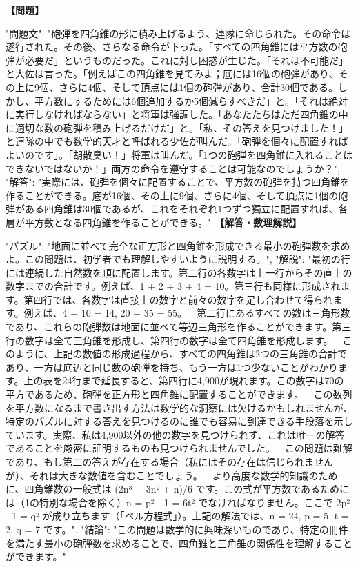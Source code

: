 \documentclass[10pt,a4paper,oneside,openany]{ltjsbook}
\begin{document}
\begin{tcolorbox}[colback=softblue,colframe=primaryblue,title=\textbf{第 138 問：THE ARTILLERYMEN'S DILEMMA.},arc=2mm,boxrule=1pt,breakable]
\textbf{【問題】}\par\vspace{0.3em}
{
  "問題文": "砲弾を四角錐の形に積み上げるよう、連隊に命じられた。その命令は遂行された。その後、さらなる命令が下った。「すべての四角錐には平方数の砲弾が必要だ」というものだった。これに対し困惑が生じた。「それは不可能だ」と大佐は言った。「例えばこの四角錐を見てみよ；底には16個の砲弾があり、その上に9個、さらに4個、そして頂点には1個の砲弾があり、合計30個である。しかし、平方数にするためには6個追加するか5個減らすべきだ」と。「それは絶対に実行しなければならない」と将軍は強調した。「あなたたちはただ四角錐の中に適切な数の砲弾を積み上げるだけだ」と。「私、その答えを見つけました！」と連隊の中でも数学的天才と呼ばれる少佐が叫んだ。「砲弾を個々に配置すればよいのです」。「胡散臭い！」将軍は叫んだ。「1つの砲弾を四角錐に入れることはできないではないか！」両方の命令を遵守することは可能なのでしょうか？",
  "解答": "実際には、砲弾を個々に配置することで、平方数の砲弾を持つ四角錐を作ることができる。底が16個、その上に9個、さらに4個、そして頂点に1個の砲弾がある四角錐は30個であるが、これをそれぞれ1つずつ獨立に配置すれば、各層が平方数となる四角錐を作ることができる。"
}
\tcblower
\textbf{【解答・数理解説】}\par\vspace{0.3em}
{
    "パズル": "地面に並べて完全な正方形と四角錐を形成できる最小の砲弾数を求めよ。この問題は、初学者でも理解しやすいように説明する。",
    "解説": "最初の行には連続した自然数を順に配置します。第二行の各数字は上一行からその直上の数字までの合計です。例えば、1 + 2 + 3 + 4 = 10。第三行も同様に形成されます。第四行では、各数字は直接上の数字と前々の数字を足し合わせて得られます。例えば、4 + 10 = 14, 20 + 35 = 55。\
\
第二行にあるすべての数は三角形数であり、これらの砲弾数は地面に並べて等辺三角形を作ることができます。第三行の数字は全て三角錐を形成し、第四行の数字は全て四角錐を形成します。\
\
このように、上記の数値の形成過程から、すべての四角錐は2つの三角錐の合計であり、一方は底辺と同じ数の砲弾を持ち、もう一方は1つ少ないことがわかります。上の表を24行まで延長すると、第四行に4,900が現れます。この数字は70の平方であるため、砲弾を正方形と四角錐に配置することができます。\
\
この数列を平方数になるまで書き出す方法は数学的な洞察には欠けるかもしれませんが、特定のパズルに対する答えを見つけるのに誰でも容易に到達できる手段落を示しています。実際、私は4,900以外の他の数字を見つけられず、これは唯一の解答であることを厳密に証明するものも見つけられませんでした。\
\
この問題は難解であり、もし第二の答えが存在する場合（私にはその存在は信じられませんが）、それは大きな数値を含むことでしょう。\
\
より高度な数学的知識のために、四角錐数の一般式は (2n³ + 3n² + n)/6 です。この式が平方数であるためには（1の特別な場合を除く）n = p² - 1 = 6t² でなければなりません。ここで 2p² - 1 = q² が成り立ちます（「ペル方程式」）。上記の解法では、n = 24, p = 5, t = 2, q = 7 です。",
    "結論": "この問題は数学的に興味深いものであり、特定の冊件を満たす最小の砲弾数を求めることで、四角錐と三角錐の関係性を理解することができます。"
}
\end{tcolorbox}
\end{document}
